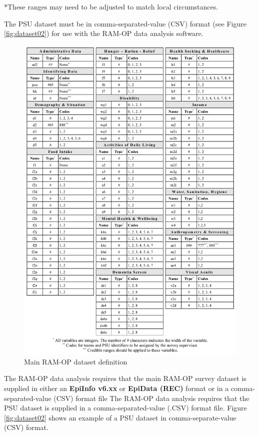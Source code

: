 \documentclass[12pt,a4paper]{book}
\theoremstyle{definition}
\theoremstyle{definition}
\theoremstyle{definition}
\theoremstyle{remark}
\begin{document}
*These ranges may need to be adjusted to match local circumstances.

The PSU dataset must be in comma-separated-value (CSV) format (see
Figure \ref{fig:dataset02}) for use with the RAM-OP data analysis
software.

\begin{figure}[H]

{\centering \includegraphics[width=800pt]{figures/dataset01} 

}

\caption{Main RAM-OP dataset definition}\label{fig:dataset01}
\end{figure}

The RAM-OP data analysis requires that the main RAM-OP survey dataset is
supplied in either an \textbf{EpiInfo v6.xx} or \textbf{EpiData (REC)}
format or in a comma-separated-value (CSV) format file The RAM-OP data
analysis requires that the PSU dataset is supplied in a
comma-separated-value (.CSV) format file. Figure \ref{fig:dataset02}
shows an example of a PSU dataset in comma-separate-value (CSV) format.
\end{document}
